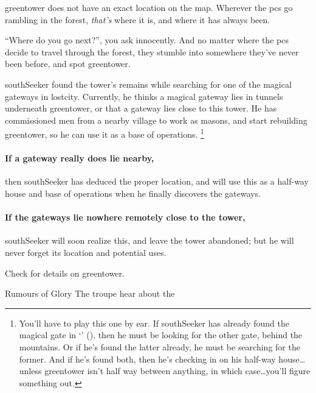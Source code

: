 
\Gls{greentower} does not have an exact location on the map.
Wherever the \glspl{pc} go \gls{rambling} in the forest, \textit{that's} where it is, and where it has always been.

``Where do you go next?'', you ask innocently.
And no matter where the \glspl{pc} decide to travel through the forest, they stumble into somewhere they've never been before, and spot \gls{greentower}.

\begin{exampletext}
  \Gls{southSeeker} found the tower's remains while searching for one of the magical gateways in \gls{lostcity}.
  Currently, he thinks a magical gateway lies in tunnels underneath \gls{greentower}, or that a gateway lies close to this tower.
  He has commissioned men from a nearby \gls{village} to work as masons, and start rebuilding \gls{greentower}, so he can use it as a base of operations.%
  \footnote{You'll have to play this one by ear.
  If \gls{southSeeker} has already found the magical gate in `' (), then he must be looking for the other gate, behind the mountains.
  Or if he's found the latter already, he must be searching for the former.
  And if he's found both, then he's checking in on his half-way house\ldots unless \gls{greentower} isn't half way between anything, in which case\ldots you'll figure something out.}
\end{exampletext}

\paragraph{If a gateway really does lie nearby,}
then \gls{southSeeker} has deduced the proper location, and will use this as a half-way house and base of operations when he finally discovers the gateways.

\paragraph{If the gateways lie nowhere remotely close to the tower,}
\gls{southSeeker} will soon realize this, and leave the tower abandoned; but he will never forget its location and potential uses.

Check  for details on \gls{greentower}.

{\squash Rumours of Glory}%
{The troupe hear about the }%

